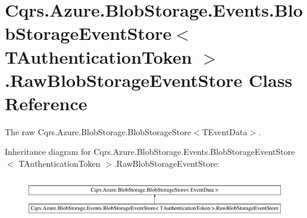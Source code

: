 \hypertarget{classCqrs_1_1Azure_1_1BlobStorage_1_1Events_1_1BlobStorageEventStore_1_1RawBlobStorageEventStore}{}\section{Cqrs.\+Azure.\+Blob\+Storage.\+Events.\+Blob\+Storage\+Event\+Store$<$ T\+Authentication\+Token $>$.Raw\+Blob\+Storage\+Event\+Store Class Reference}
\label{classCqrs_1_1Azure_1_1BlobStorage_1_1Events_1_1BlobStorageEventStore_1_1RawBlobStorageEventStore}


The raw Cqrs.\+Azure.\+Blob\+Storage.\+Blob\+Storage\+Store$<$\+T\+Event\+Data$>$.  


Inheritance diagram for Cqrs.\+Azure.\+Blob\+Storage.\+Events.\+Blob\+Storage\+Event\+Store$<$ T\+Authentication\+Token $>$.Raw\+Blob\+Storage\+Event\+Store\+:\begin{figure}[H]
\begin{center}
\leavevmode
\includegraphics[height=1.755486cm]{classCqrs_1_1Azure_1_1BlobStorage_1_1Events_1_1BlobStorageEventStore_1_1RawBlobStorageEventStore}
\end{center}
\end{figure}
